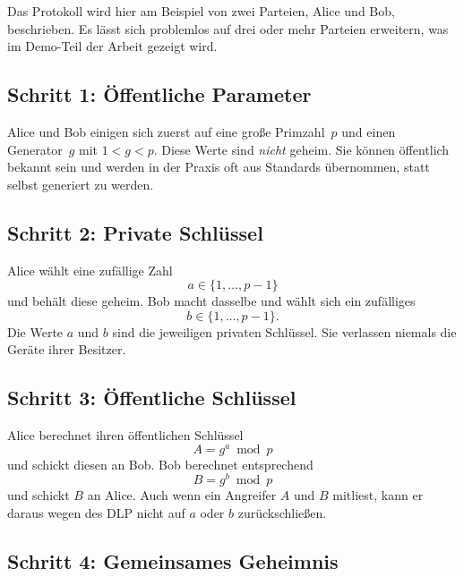 \documentclass[conference]{IEEEtran}
\begin{document}
Das Protokoll wird hier am Beispiel von zwei Parteien, Alice und Bob,
beschrieben. Es lässt sich problemlos auf drei oder mehr Parteien
erweitern, was im Demo-Teil der Arbeit gezeigt wird.

\subsection{Schritt 1: Öffentliche Parameter}

Alice und Bob einigen sich zuerst auf eine große Primzahl~$p$ und
einen Generator~$g$ mit $1 < g < p$. Diese Werte sind \emph{nicht}
geheim. Sie können öffentlich bekannt sein und werden in der Praxis
oft aus Standards übernommen, statt selbst generiert zu werden.

\subsection{Schritt 2: Private Schlüssel}

Alice wählt eine zufällige Zahl
\begin{equation}
    a \in \{1, \ldots, p-1\}
\end{equation}
und behält diese geheim. Bob macht dasselbe und wählt sich ein
zufälliges
\begin{equation}
    b \in \{1, \ldots, p-1\}.
\end{equation}
Die Werte $a$ und $b$ sind die jeweiligen privaten Schlüssel. Sie
verlassen niemals die Geräte ihrer Besitzer.

\subsection{Schritt 3: Öffentliche Schlüssel}

Alice berechnet ihren öffentlichen Schlüssel
\begin{equation}
    A = g^a \bmod p
\end{equation}
und schickt diesen an Bob. Bob berechnet entsprechend
\begin{equation}
    B = g^b \bmod p
\end{equation}
und schickt $B$ an Alice. Auch wenn ein Angreifer $A$ und $B$
mitliest, kann er daraus wegen des DLP nicht auf $a$ oder $b$
zurückschließen.

\subsection{Schritt 4: Gemeinsames Geheimnis}
\end{document}
